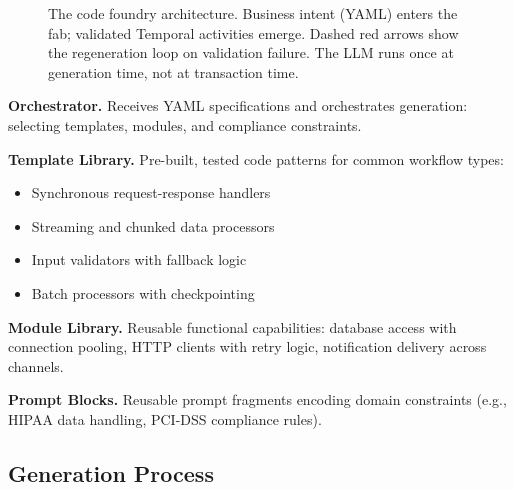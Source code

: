 \documentclass[11pt]{article}
\begin{document}
\begin{figure}[ht]
{
}%
\caption{The code foundry architecture. Business intent (YAML) enters the fab; validated Temporal activities emerge. Dashed red arrows show the regeneration loop on validation failure. The LLM runs once at generation time, not at transaction time.}
\label{fig:architecture}
\end{figure}

\textbf{Orchestrator.} Receives YAML specifications and orchestrates generation: selecting templates, modules, and compliance constraints.

\textbf{Template Library.} Pre-built, tested code patterns for common workflow types:
\begin{itemize}
    \item Synchronous request-response handlers
    \item Streaming and chunked data processors
    \item Input validators with fallback logic
    \item Batch processors with checkpointing
\end{itemize}

\textbf{Module Library.} Reusable functional capabilities: database access with connection pooling, HTTP clients with retry logic, notification delivery across channels.

\textbf{Prompt Blocks.} Reusable prompt fragments encoding domain constraints (e.g., HIPAA data handling, PCI-DSS compliance rules).

\subsection{Generation Process}
\end{document}
